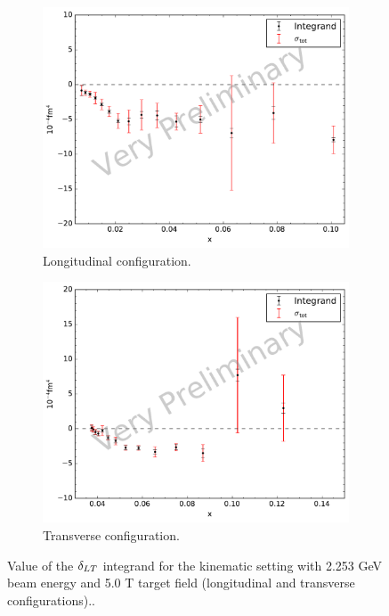 \begin{figure}[p!]
  \centering
  \begin{subfigure}[t]{0.79\textwidth}
    \includegraphics[width=\textwidth]{figs/dlt-model-22535000.pdf}
    \caption{Longitudinal configuration. \label{C8S5F2a}}
  \end{subfigure}
  \begin{subfigure}[t]{0.79\textwidth}
    \includegraphics[width=\textwidth]{figs/dlt-model-22535090.pdf}
    \caption{Transverse configuration. \label{C8S5F2b}}
  \end{subfigure}
  \caption[$\dlt$ integrand with $E=2.253$ GeV and $B=5.0$ T.]{Value of the $\dlt$ integrand for the kinematic setting with 2.253 GeV beam energy and 5.0 T target field (longitudinal and transverse configurations).. \label{C8S5F2}}
\end{figure}


